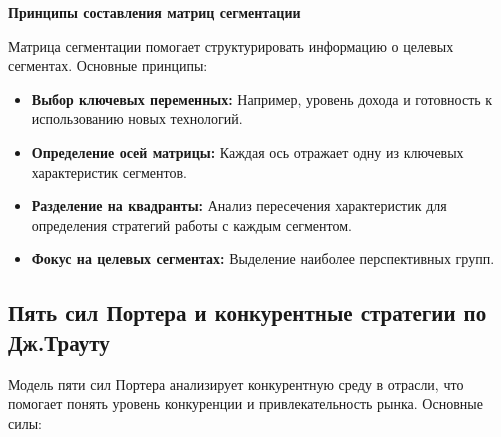 \textbf{Принципы составления матриц сегментации}

Матрица сегментации помогает структурировать информацию о целевых сегментах. Основные принципы:
\begin{itemize}
    \item \textbf{Выбор ключевых переменных:} Например, уровень дохода и готовность к использованию новых технологий.
    \item \textbf{Определение осей матрицы:} Каждая ось отражает одну из ключевых характеристик сегментов.
    \item \textbf{Разделение на квадранты:} Анализ пересечения характеристик для определения стратегий работы с каждым сегментом.
    \item \textbf{Фокус на целевых сегментах:} Выделение наиболее перспективных групп.
\end{itemize}

\pagebreak

\subsection{Пять сил Портера и конкурентные стратегии по Дж.Трауту}

Модель пяти сил Портера анализирует конкурентную среду в отрасли, что помогает понять уровень конкуренции и привлекательность рынка. Основные силы:

